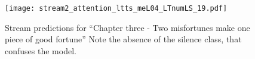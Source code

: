 \begin{figure}[h!]
    \centering
    \texttt{[image: stream2\_attention\_ltts\_meL04\_LTnumLS\_19.pdf]}
    \caption{Stream predictions for
        ``Chapter three - Two misfortunes make one piece of good fortune''
        Note the absence of the silence class, that confuses the model.
    }%
    \label{fig:stream_attention_ltts_meL04_LTnumLS_19}
\end{figure}




